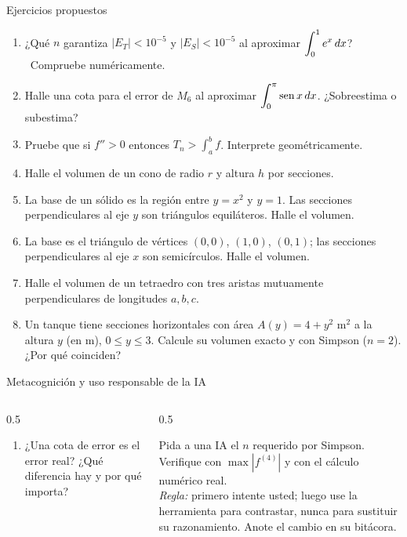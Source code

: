 \documentclass[10pt,aspectratio=169]{beamer}
\begin{document}
\begin{frame}{Ejercicios propuestos}
  \small
  \begin{ejercicio}
    \begin{enumerate}
      \item ¿Qué $n$ garantiza $|E_T|<10^{-5}$ y $|E_S|<10^{-5}$ al aproximar $\displaystyle\int_0^1e^{x}\,dx$? \ Compruebe numéricamente.
      \item Halle una cota para el error de $M_6$ al aproximar $\displaystyle\int_0^\pi\operatorname{sen} x\,dx$. ¿Sobreestima o subestima?
      \item Pruebe que si $f''>0$ entonces $T_n>\int_a^bf$. Interprete geométricamente.
      \item Halle el volumen de un cono de radio $r$ y altura $h$ por secciones.
      \item La base de un sólido es la región entre $y=x^2$ y $y=1$. Las secciones perpendiculares al eje $y$ son
        triángulos equiláteros. Halle el volumen.
      \item La base es el triángulo de vértices $(0,0)$, $(1,0)$, $(0,1)$; las secciones perpendiculares al eje $x$ son
        semicírculos. Halle el volumen.
      \item Halle el volumen de un tetraedro con tres aristas mutuamente perpendiculares de longitudes $a,b,c$.
      \item Un tanque tiene secciones horizontales con área $A(y)=4+y^2$ m$^2$ a la altura $y$ (en m), $0\le y\le3$.
        Calcule su volumen exacto y con Simpson ($n=2$). ¿Por qué coinciden?
    \end{enumerate}
  \end{ejercicio}
\end{frame}

\begin{frame}{Metacognición y uso responsable de la IA}
  \small
  \begin{columns}[t]
    \begin{column}{0.5\textwidth}
      \begin{metacog}
        \begin{enumerate}
          \metacomun
          \item ¿Una cota de error es el error real? ¿Qué diferencia hay y por qué importa?
        \end{enumerate}
      \end{metacog}
    \end{column}
    \begin{column}{0.5\textwidth}
      \begin{iabox}
        Pida a una IA el $n$ requerido por Simpson. Verifique con $\max|f^{(4)}|$ y con el cálculo numérico real.\\[2pt]
        \textit{Regla:} primero intente usted; luego use la herramienta para contrastar, nunca para sustituir su razonamiento. Anote el cambio en su bitácora.
      \end{iabox}
    \end{column}
  \end{columns}
\end{frame}
\end{document}
